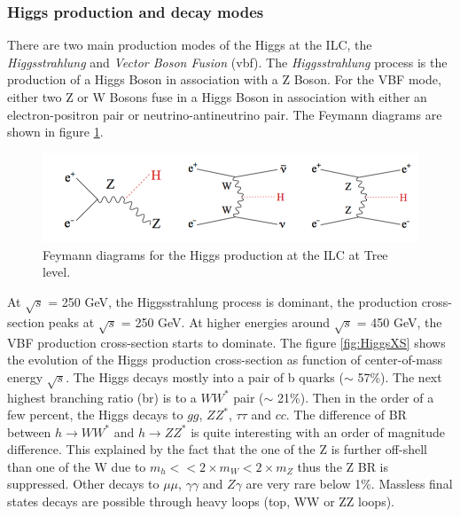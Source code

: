\subsubsection{Higgs production and decay modes}

There are two main production modes of the Higgs at the ILC, the \textit{Higgsstrahlung} and \textit{Vector Boson Fusion} (\acrshort{vbf}). The \textit{Higgsstrahlung} process is the production of a Higgs Boson in association with a Z Boson. For the VBF mode, either two Z or W Bosons fuse in a Higgs Boson in association with either an electron-positron pair or neutrino-antineutrino pair. The Feymann diagrams are shown in figure \ref{fig:HiggsProd}.

\begin{figure}[htbp!]
  \centering
  \includegraphics[width=1\linewidth]{chap2/fig/HiggsProd.png}
  \caption{Feymann diagrams for the Higgs production at the ILC at Tree level. \cite{ILC_TDR_Vol2}} \label{fig:HiggsProd}
\end{figure}

At $\sqrt{s}$ = 250 GeV, the Higgsstrahlung process is dominant, the production cross-section peaks at $\sqrt{s}$ = 250 GeV. At higher energies around $\sqrt{s}$ = 450 GeV, the VBF production cross-section starts to dominate. The figure \ref{fig:HiggsXS} shows the evolution of the Higgs production cross-section as function of center-of-mass energy $\sqrt{s}$.
The Higgs decays mostly into a pair of b quarks ($\sim$ 57\%). The next highest branching ratio (\acrshort{br}) is to a $WW^*$ pair ($\sim$ 21\%). Then in the order of a few percent, the Higgs decays to $gg$, $ZZ^*$, $\tau\tau$ and $cc$. The difference of BR between $h \rightarrow WW^*$ and $h \rightarrow ZZ^*$ is quite interesting with an order of magnitude difference. This explained by the fact that the one of the Z is further off-shell than one of the W due to $m_h << 2 \times m_W < 2 \times m_Z$ thus the Z BR is suppressed.
Other decays to $\mu \mu$, $\gamma \gamma$ and $Z\gamma$ are very rare below 1\%. Massless final states decays are possible through heavy loops (top, WW or ZZ loops).

